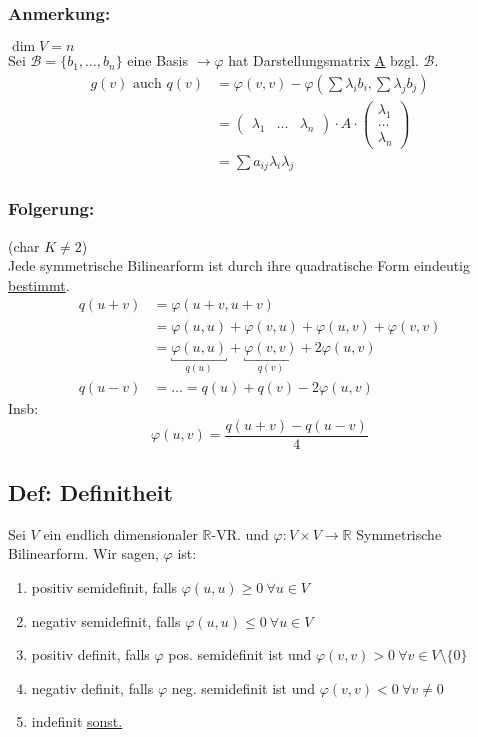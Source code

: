 \documentclass[titlepage,12pt,a4paper,ngerman]{report}
\newcommand{\tx}[1]{\textrm{#1}}
\begin{document}
\subsubsection*{Anmerkung:}
$ \dim V = n $\\
Sei $ \mathcal{B} = \{b_1,\dots,b_n\} $ eine Basis $ \rightarrow \varphi $ hat Darstellungsmatrix \underline{\underline{A}} bzgl. $ \mathcal{B} $.
\begin{align*}
 g(v) \tx{ auch }q(v) & = \varphi(v,v) - \varphi(\sum\lambda_i b_i , \sum \lambda_j b_j)\\
& = \begin{pmatrix}
\lambda_1 & \dots & \lambda_n
\end{pmatrix} \cdot A \cdot \begin{pmatrix}
\lambda_1\\
\dots\\
\lambda_n
\end{pmatrix}\\
& = \sum a_{ij} \lambda_i \lambda_j
\end{align*}
\subsubsection*{Folgerung:}
(char $ K \neq 2 $)\\
Jede symmetrische Bilinearform ist durch ihre quadratische Form eindeutig \underline{bestimmt}.
\begin{align*}
q(u+v) & = \varphi(u+v,u+v)\\
& = \varphi(u,u) + \varphi(v,u) + \varphi(u,v) + \varphi(v,v)\\
& = \underbracket{\varphi(u,u)}_{q(u)} + \underbracket{\varphi(v,v)}_{q(v)} + 2 \varphi(u,v)\\
q(u-v) & = \dots = q(u) + q(v) - 2 \varphi(u,v)
\end{align*}
Insb:
$$ \varphi(u,v) = \frac{q(u+v) - q(u-v)}{4} $$


\subsection{Def: Definitheit}
Sei $V$ ein endlich dimensionaler $\mathbb R$-VR. und $ \varphi:V\times V \to \mathbb R$ Symmetrische Bilinearform. Wir sagen, $\varphi$ ist:
\begin{enumerate}
	\item positiv semidefinit, falls $\varphi(u, u) \geq 0\ \forall u \in V$
	\item negativ semidefinit, falls $\varphi(u,u) \leq 0\ \forall u \in V$
	\item positiv definit, falls $\varphi$ pos. semidefinit ist und $\varphi(v,v) > 0\ \forall v \in V \setminus \{0\}$
	\item negativ definit, falls $\varphi$ neg. semidefinit ist und $\varphi(v,v) < 0\ \forall v \neq 0$
	\item indefinit \underline{sonst.}
\end{enumerate}
\end{document}
